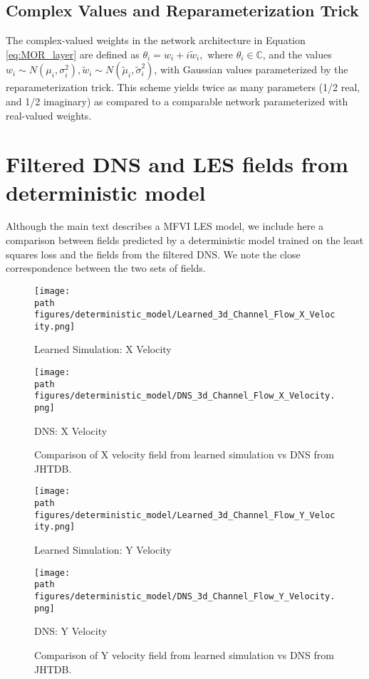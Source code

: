 \subsection{Complex Values and Reparameterization Trick}\label{Complex_Reparameterization}
The complex-valued weights in the network architecture in Equation \eqref{eq:MOR_layer} are defined as
$ \theta_i = w_i+i\tilde w_i,$
where $\theta_i \in \mathbb{C}$, and the values $w_i \sim N(\mu_i, \sigma_i^2), \tilde w_i \sim N(\tilde \mu_i, \tilde \sigma_i^2)$, with Gaussian values parameterized by the reparameterization trick. This scheme yields twice as many parameters (1/2 real, and 1/2 imaginary) as compared to a comparable network parameterized with real-valued weights.

\section{Filtered DNS and LES fields from deterministic model}\label{sec:deteministic_les}

Although the main text describes a MFVI LES model, we include here a comparison between fields predicted by a deterministic model trained on the least squares loss and the fields from the filtered DNS. We note the close correspondence between the two sets of fields.

\begin{figure}[H]
    \centering
    \begin{minipage}[b]{1.0\linewidth}
        \centering
        \texttt{[image: \\path figures/deterministic\_model/Learned\_3d\_Channel\_Flow\_X\_Velocity.png]}
        \caption{Learned Simulation: X Velocity}
    \end{minipage}
    \begin{minipage}[b]{1.0\linewidth}
        \centering
        \texttt{[image: \\path figures/deterministic\_model/DNS\_3d\_Channel\_Flow\_X\_Velocity.png]}
        \caption{DNS: X Velocity}
    \end{minipage}
    \caption{Comparison of X velocity field from learned simulation vs DNS from JHTDB.}
    \label{fig:deterministic_x_velocity}
\end{figure}

\begin{figure}[H]
    \centering
    \begin{minipage}[b]{1.0\linewidth}
        \centering
        \texttt{[image: \\path figures/deterministic\_model/Learned\_3d\_Channel\_Flow\_Y\_Velocity.png]}
        \caption{Learned Simulation: Y Velocity}
    \end{minipage}
    \begin{minipage}[b]{1.0\linewidth}
        \centering
        \texttt{[image: \\path figures/deterministic\_model/DNS\_3d\_Channel\_Flow\_Y\_Velocity.png]}
        \caption{DNS: Y Velocity}
    \end{minipage}
    \caption{Comparison of Y velocity field from learned simulation vs DNS from JHTDB.}
    \label{fig:deterministic_y_velocity}
\end{figure}

